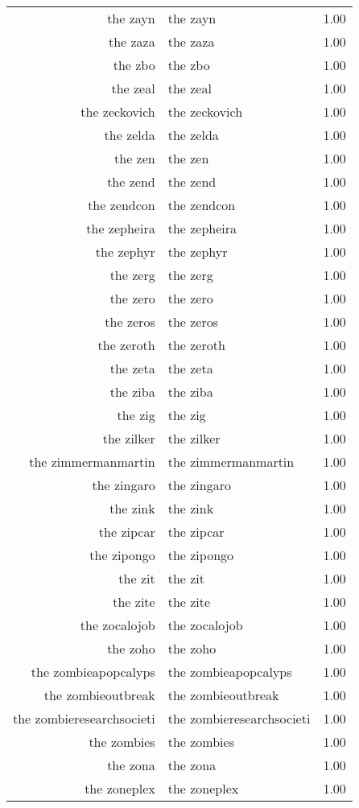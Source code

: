 \begin{table}[ht]
\begin{tabular}{rlr}
  the zayn & the zayn & 1.00 \\ 
  the zaza & the zaza & 1.00 \\ 
  the zbo & the zbo & 1.00 \\ 
  the zeal & the zeal & 1.00 \\ 
  the zeckovich & the zeckovich & 1.00 \\ 
  the zelda & the zelda & 1.00 \\ 
  the zen & the zen & 1.00 \\ 
  the zend & the zend & 1.00 \\ 
  the zendcon & the zendcon & 1.00 \\ 
  the zepheira & the zepheira & 1.00 \\ 
  the zephyr & the zephyr & 1.00 \\ 
  the zerg & the zerg & 1.00 \\ 
  the zero & the zero & 1.00 \\ 
  the zeros & the zeros & 1.00 \\ 
  the zeroth & the zeroth & 1.00 \\ 
  the zeta & the zeta & 1.00 \\ 
  the ziba & the ziba & 1.00 \\ 
  the zig & the zig & 1.00 \\ 
  the zilker & the zilker & 1.00 \\ 
  the zimmermanmartin & the zimmermanmartin & 1.00 \\ 
  the zingaro & the zingaro & 1.00 \\ 
  the zink & the zink & 1.00 \\ 
  the zipcar & the zipcar & 1.00 \\ 
  the zipongo & the zipongo & 1.00 \\ 
  the zit & the zit & 1.00 \\ 
  the zite & the zite & 1.00 \\ 
  the zocalojob & the zocalojob & 1.00 \\ 
  the zoho & the zoho & 1.00 \\ 
  the zombieapopcalyps & the zombieapopcalyps & 1.00 \\ 
  the zombieoutbreak & the zombieoutbreak & 1.00 \\ 
  the zombieresearchsocieti & the zombieresearchsocieti & 1.00 \\ 
  the zombies & the zombies & 1.00 \\ 
  the zona & the zona & 1.00 \\ 
  the zoneplex & the zoneplex & 1.00 \\ 

\end{tabular}
\end{table}
